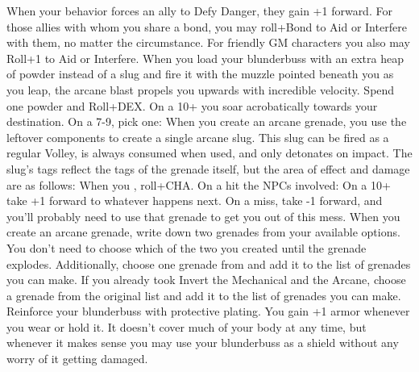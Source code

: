\documentclass[darkmode]{dw_playbook}
\begin{document}
\pageThree
    {
        \advancedMovesCont
    }
    {
            {
            When your behavior forces an ally to Defy Danger, they gain +1 forward.  For those allies with whom you share a bond, you may roll+Bond to Aid or Interfere with them, no matter the circumstance.  For friendly GM characters you also may Roll+1 to Aid or Interfere.}
        \gap
            {
            When you load your blunderbuss with an extra heap of powder instead of a slug and fire it with the muzzle pointed beneath you as you leap, the arcane blast propels you upwards with incredible velocity.  Spend one powder and Roll+DEX.  On a 10+ you soar acrobatically towards your destination.  On a 7-9, pick one:
            \gapSm
            \gapSm
            }
        \gap
            {When you create an arcane grenade, you use the leftover components to create a single arcane slug.  This slug can be fired as a regular Volley, is always consumed when used, and only detonates on impact.  The slug’s tags reflect the tags of the grenade itself, but the area of effect and damage are as follows:
            \gapSm
            \gapSm
            \gapSm
            \gapSm
            \gapSm
            \gapSm
            }
            {When you , roll+CHA.  On a hit the NPCs involved:
            \gapSm
            \gapSm
            \gapSm
            \gap
            On a 10+ take +1 forward to whatever happens next.  On a miss, take -1 forward, and you’ll probably need to use that grenade to get you out of this mess.}
        \gap
            {When you create an arcane grenade, write down two grenades from your available options.  You don’t need to choose which of the two you created until the grenade explodes.
            \gap
            Additionally, choose one grenade from  and add it to the list of grenades you can make.  If you already took Invert the Mechanical and the Arcane, choose a grenade from the original list and add it to the list of grenades you can make.}
        \gap
            {
            Reinforce your blunderbuss with protective plating.  You gain +1 armor whenever you wear or hold it.  It doesn’t cover much of your body at any time, but whenever it makes sense you may use your blunderbuss as a shield without any worry of it getting damaged.}
    }
    {
        ~
    }
\end{document}

